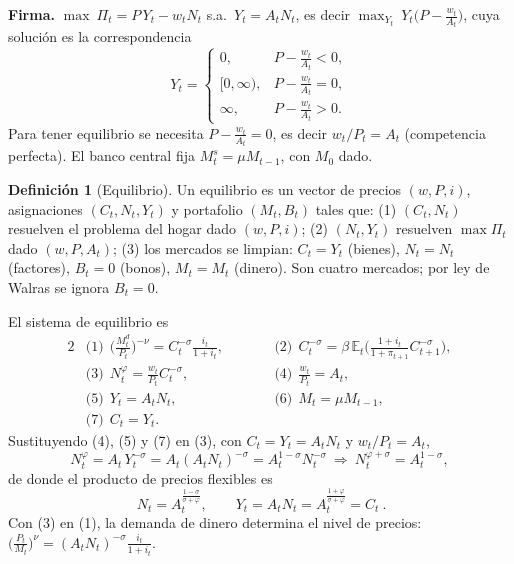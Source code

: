 \documentclass[11pt]{article}
\renewcommand{\boxed}[1]{#1}     %
\theoremstyle{definition}
\newtheorem{definicion}{Definición}[section]
\newcommand{\E}{\mathbb{E}}
\begin{document}
\textbf{Firma.} $\max\ \Pi_{t}=P\,Y_{t}-w_{t}N_{t}$ s.a.\ $Y_{t}=A_{t}N_{t}$, es decir
$\max_{Y_{t}}\ Y_{t}\big(P-\tfrac{w_{t}}{A_{t}}\big)$, cuya solución es la correspondencia
\begin{equation}
Y_{t}=
\begin{cases}
0, & P-\tfrac{w_{t}}{A_{t}}<0,\\[3pt]
[0,\infty), & P-\tfrac{w_{t}}{A_{t}}=0,\\[3pt]
\infty, & P-\tfrac{w_{t}}{A_{t}}>0.
\end{cases}
\end{equation}
Para tener equilibrio se necesita $P-\tfrac{w_{t}}{A_{t}}=0$, es decir $w_{t}/P_{t}=A_{t}$
(competencia perfecta). El banco central fija $M_{t}^{s}=\mu M_{t-1}$, con $M_{0}$ dado.

\begin{definicion}[Equilibrio]
Un equilibrio es un vector de precios $(w,P,i)$, asignaciones $(C_{t},N_{t},Y_{t})$ y portafolio
$(M_{t},B_{t})$ tales que: (1) $(C_{t},N_{t})$ resuelven el problema del hogar dado $(w,P,i)$;
(2) $(N_{t},Y_{t})$ resuelven $\max\Pi_{t}$ dado $(w,P,A_{t})$; (3) los mercados se limpian:
$C_{t}=Y_{t}$ (bienes), $N_{t}=N_{t}$ (factores), $B_{t}=0$ (bonos), $M_{t}=M_{t}$ (dinero). Son cuatro
mercados; por ley de Walras se ignora $B_{t}=0$.
\end{definicion}

El sistema de equilibrio es
\begin{alignat}{2}
&\text{(1)}\ \ \Big(\frac{M_{t}^{d}}{P_{t}}\Big)^{-\nu}=C_{t}^{-\sigma}\frac{i_{t}}{1+i_{t}},
&\qquad
&\text{(2)}\ \ C_{t}^{-\sigma}=\beta\,\E_{t}\!\Big(\frac{1+i_{t}}{1+\pi_{t+1}}C_{t+1}^{-\sigma}\Big),\\[4pt]
&\text{(3)}\ \ N_{t}^{\varphi}=\frac{w_{t}}{P_{t}}C_{t}^{-\sigma},
&\qquad
&\text{(4)}\ \ \frac{w_{t}}{P_{t}}=A_{t},\\[4pt]
&\text{(5)}\ \ Y_{t}=A_{t}N_{t},
&\qquad
&\text{(6)}\ \ M_{t}=\mu M_{t-1},\\[4pt]
&\text{(7)}\ \ C_{t}=Y_{t}. & &
\end{alignat}
Sustituyendo (4), (5) y (7) en (3), con $C_{t}=Y_{t}=A_{t}N_{t}$ y $w_{t}/P_{t}=A_{t}$,
\begin{equation}
N_{t}^{\varphi}=A_{t}\,Y_{t}^{-\sigma}=A_{t}(A_{t}N_{t})^{-\sigma}=A_{t}^{1-\sigma}N_{t}^{-\sigma}
\ \Longrightarrow\
N_{t}^{\varphi+\sigma}=A_{t}^{1-\sigma},
\end{equation}
de donde el producto de precios flexibles es
\begin{equation}
\boxed{\ N_{t}=A_{t}^{\frac{1-\sigma}{\sigma+\varphi}},\qquad
Y_{t}=A_{t}N_{t}=A_{t}^{\frac{1+\varphi}{\sigma+\varphi}}=C_{t}\ }.
\end{equation}
Con (3) en (1), la demanda de dinero determina el nivel de precios:
$\big(\tfrac{P_{t}}{M_{t}}\big)^{\nu}=(A_{t}N_{t})^{-\sigma}\tfrac{i_{t}}{1+i_{t}}$.
\end{document}
